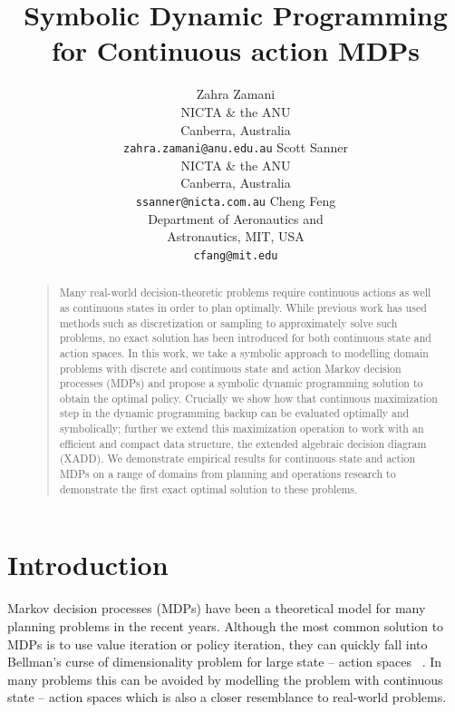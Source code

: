 \documentclass[letterpaper]{article}
\begin{document}
%
\title{Symbolic Dynamic Programming for Continuous action MDPs}
\author{Zahra Zamani\\
NICTA \& the ANU\\
Canberra, Australia\\
{\tt zahra.zamani@anu.edu.au}
\And
Scott Sanner\\
NICTA \& the ANU\\
Canberra, Australia\\
{\tt ssanner@nicta.com.au}
\And
Cheng Feng\\
Department of Aeronautics and\\
Astronautics, MIT, USA\\
{\tt cfang@mit.edu}
}
\maketitle
\begin{abstract}
\begin{quote}
Many real-world decision-theoretic problems require continuous actions as well as continuous 
states in order to plan optimally. While previous work has used methods such as discretization or 
sampling to approximately solve such problems, no exact solution has been introduced for both 
continuous state and action spaces. In this work, we take a symbolic approach to modelling domain 
problems with discrete and continuous state and action Markov decision processes (MDPs) and 
propose a symbolic dynamic programming solution to obtain the optimal policy. Crucially we show 
how that continuous maximization step in the dynamic programming backup can be evaluated 
optimally and symbolically; further we extend this maximization operation to work with an 
efficient and compact data structure, the extended algebraic decision diagram (XADD). We 
demonstrate empirical results for continuous state and action MDPs on a range of domains from 
planning and operations research to demonstrate the first exact optimal solution to these 
problems.
\end{quote}
\end{abstract}


\section{Introduction}


Markov decision processes (MDPs) have been a theoretical model for many planning problems in the recent years. Although the most common solution to MDPs is to use value iteration or policy iteration, they can quickly fall into Bellman's curse of dimensionality problem for large state – action spaces ~\cite{puterman}. In many problems this can be avoided by modelling the problem with continuous state – action spaces which is also a closer resemblance to real-world problems. 
\end{document}
